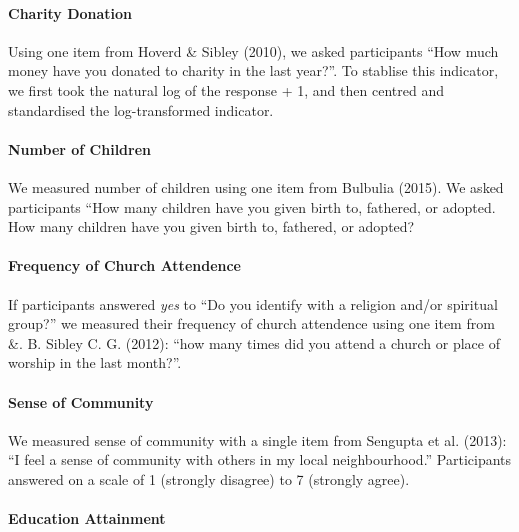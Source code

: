 \documentclass[
  letterpaper,
  DIV=11,
  numbers=noendperiod]{scrartcl}
\let\oldparagraph\paragraph
\renewcommand{\paragraph}[1]{\oldparagraph{#1}\mbox{}}
\begin{document}
\hypertarget{charity-donation}{%
\paragraph{Charity Donation}\label{charity-donation}}

Using one item from Hoverd \& Sibley (2010), we asked participants ``How
much money have you donated to charity in the last year?''. To stablise
this indicator, we first took the natural log of the response + 1, and
then centred and standardised the log-transformed indicator.

\hypertarget{number-of-children}{%
\paragraph{Number of Children}\label{number-of-children}}

We measured number of children using one item from Bulbulia (2015). We
asked participants ``How many children have you given birth to,
fathered, or adopted. How many children have you given birth to,
fathered, or adopted?

\hypertarget{frequency-of-church-attendence}{%
\paragraph{Frequency of Church
Attendence}\label{frequency-of-church-attendence}}

If participants answered \emph{yes} to ``Do you identify with a religion
and/or spiritual group?'' we measured their frequency of church
attendence using one item from \&. B. Sibley C. G. (2012): ``how many
times did you attend a church or place of worship in the last month?''.

\hypertarget{sense-of-community}{%
\paragraph{Sense of Community}\label{sense-of-community}}

We measured sense of community with a single item from Sengupta et al.
(2013): ``I feel a sense of community with others in my local
neighbourhood.'' Participants answered on a scale of 1 (strongly
disagree) to 7 (strongly agree).

\hypertarget{education-attainment}{%
\paragraph{Education Attainment}\label{education-attainment}}
\end{document}
